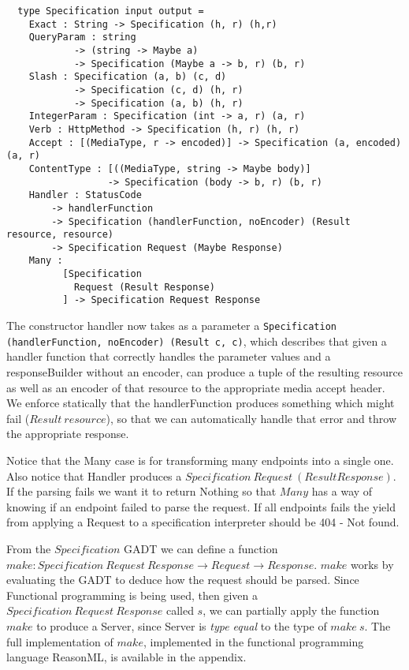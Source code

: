 \begin{lstlisting}
  type Specification input output =
    Exact : String -> Specification (h, r) (h,r)
    QueryParam : string 
            -> (string -> Maybe a) 
            -> Specification (Maybe a -> b, r) (b, r)
    Slash : Specification (a, b) (c, d) 
            -> Specification (c, d) (h, r) 
            -> Specification (a, b) (h, r) 
    IntegerParam : Specification (int -> a, r) (a, r)
    Verb : HttpMethod -> Specification (h, r) (h, r)
    Accept : [(MediaType, r -> encoded)] -> Specification (a, encoded) (a, r)
    ContentType : [((MediaType, string -> Maybe body)]
                  -> Specification (body -> b, r) (b, r)
    Handler : StatusCode 
        -> handlerFunction 
        -> Specification (handlerFunction, noEncoder) (Result resource, resource)
        -> Specification Request (Maybe Response)
    Many :
          [Specification 
            Request (Result Response)
          ] -> Specification Request Response
\end{lstlisting}

The constructor handler now takes as a parameter a \texttt{Specification
(handlerFunction, noEncoder) (Result c, c)}, which describes that given a
handler function that correctly handles the parameter values and a
responseBuilder without an encoder, can produce a tuple of the resulting
resource as well as an encoder of that resource to the appropriate media accept
header. We enforce statically that the handlerFunction produces something which
might fail ($Result\ resource$), so that we can automatically handle that error
and throw the appropriate response. 

Notice that the Many case is for transforming many endpoints into a single one.
Also notice that Handler produces a $Specification\ Request\ (Result Response)$.
If the parsing fails we want it to return Nothing so that $Many$ has a way of
knowing if an endpoint failed to parse the request. If all endpoints fails the
yield from applying a Request to a specification interpreter should be 404 - Not
found.

From the $Specification$ GADT we can define a function $make : Specification\
Request\ Response \rightarrow Request \rightarrow Response$.  $make$ works by
evaluating the GADT to deduce how the request should be parsed.  Since
Functional programming is being used, then given a $Specification\ Request\
Response$ called $s$, we can partially apply the function $make$ to produce a
Server, since Server is \textit{type equal} to the type of $make\ s$. The full
implementation of $make$, implemented in the functional programming language
ReasonML, is available in the appendix.

